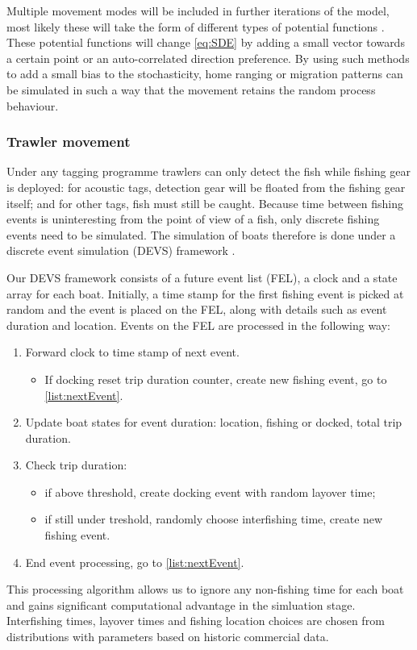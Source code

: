\documentclass{article}
\begin{document}
Multiple movement modes will be included in further iterations of the model, most likely these will take the form of different types of potential functions \citep{brillinger2001use}. These potential functions will change \eqref{eq:SDE} by adding a small vector towards a certain point or an auto-correlated direction preference. By using such methods to add a small bias to the stochasticity, home ranging or migration patterns can be simulated in such a way that the movement retains the random process behaviour.

\subsubsection*{Trawler movement}

Under any tagging programme trawlers can only detect the fish while fishing gear is deployed: for acoustic tags, detection gear will be floated from the fishing gear itself; and for other tags, fish must still be caught. Because time between fishing events is uninteresting from the point of view of a fish, only discrete fishing events need to be simulated. The simulation of boats therefore is done under a discrete event simulation (DEVS) framework \citep{fishman2001discrete}.

Our DEVS framework consists of a future event list (FEL), a clock and a state array for each boat. Initially, a time stamp for the first fishing event is picked at random and the event is placed on the FEL, along with details such as event duration and location. Events on the FEL are processed in the following way:
\begin{enumerate}
  \item Forward clock to time stamp of next event. \label{list:nextEvent}
    \begin{itemize}
      \item If docking reset trip duration counter, create new fishing event, go to \ref{list:nextEvent}.
    \end{itemize}
  \item Update boat states for event duration: location, fishing or docked, total trip duration.
  \item Check trip duration:
  \begin{itemize}
    \item if above threshold, create docking event with random layover time;
    \item if still under treshold, randomly choose interfishing time, create new fishing event.
  \end{itemize}
  \item End event processing, go to \ref{list:nextEvent}.
\end{enumerate}
This processing algorithm allows us to ignore any non-fishing time for each boat and gains significant computational advantage in the simluation stage. Interfishing times, layover times and fishing location choices are chosen from distributions with parameters based on historic commercial data.
\end{document}
